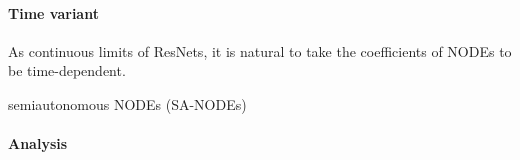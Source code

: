 \documentclass{article}
\newcounter{ct}
\begin{document}

\paragraph{Time variant}
As continuous limits of ResNets, it is natural to take the coefficients of NODEs to be time-dependent.

semiautonomous NODEs (SA-NODEs)  \citep{li2024universal}


\paragraph{Analysis}
 \citep{massaroli2020nodes}


%
%
%
%
\end{document}
